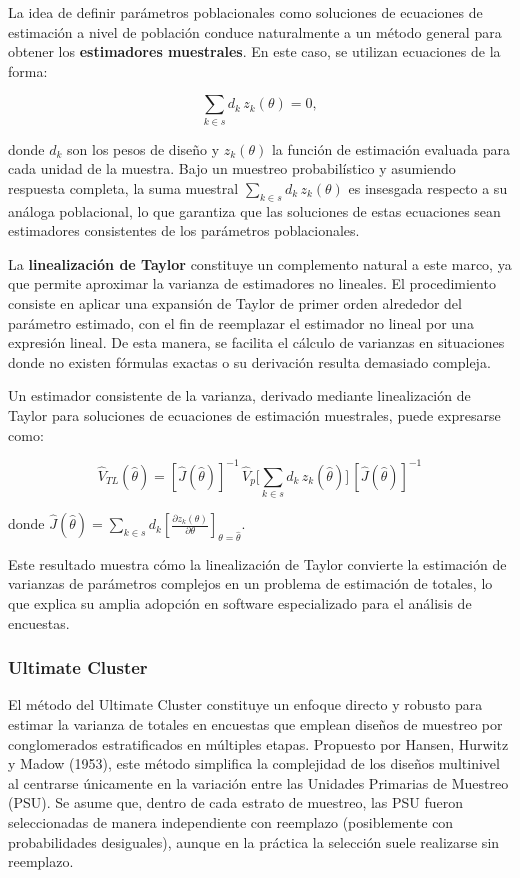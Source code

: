 \documentclass[
  12pt,
]{book}
\begin{document}
La idea de definir parámetros poblacionales como soluciones de ecuaciones de estimación a nivel de población conduce naturalmente a un método general para obtener los \textbf{estimadores muestrales}. En este caso, se utilizan ecuaciones de la forma:

\[
\sum_{k\in s} d_k\, z_k(\theta)=0,
\]

donde \(d_k\) son los pesos de diseño y \(z_k(\theta)\) la función de estimación evaluada para cada unidad de la muestra. Bajo un muestreo probabilístico y asumiendo respuesta completa, la suma muestral \(\sum_{k\in s} d_k\, z_k(\theta)\) es insesgada respecto a su análoga poblacional, lo que garantiza que las soluciones de estas ecuaciones sean estimadores consistentes de los parámetros poblacionales.

La \textbf{linealización de Taylor} constituye un complemento natural a este marco, ya que permite aproximar la varianza de estimadores no lineales. El procedimiento consiste en aplicar una expansión de Taylor de primer orden alrededor del parámetro estimado, con el fin de reemplazar el estimador no lineal por una expresión lineal. De esta manera, se facilita el cálculo de varianzas en situaciones donde no existen fórmulas exactas o su derivación resulta demasiado compleja.

Un estimador consistente de la varianza, derivado mediante linealización de Taylor para soluciones de ecuaciones de estimación muestrales, puede expresarse como:

\[
\hat{V}_{TL}(\hat{\theta}) = [\hat{J}(\hat{\theta})]^{-1} \, \hat{V}_p \Bigg[\sum_{k\in s} d_k\, z_k(\hat{\theta})\Bigg] \, [\hat{J}(\hat{\theta})]^{-1}
\]

donde \(\hat{J}(\hat{\theta}) = \sum_{k\in s} d_k \left[ \frac{\partial z_k(\theta)}{\partial \theta} \right]_{\theta=\hat{\theta}}\).

Este resultado muestra cómo la linealización de Taylor convierte la estimación de varianzas de parámetros complejos en un problema de estimación de totales, lo que explica su amplia adopción en software especializado para el análisis de encuestas.

\subsubsection*{Ultimate Cluster}\label{ultimate-cluster}

El método del Ultimate Cluster constituye un enfoque directo y robusto para estimar la varianza de totales en encuestas que emplean diseños de muestreo por conglomerados estratificados en múltiples etapas. Propuesto por Hansen, Hurwitz y Madow (1953), este método simplifica la complejidad de los diseños multinivel al centrarse únicamente en la variación entre las Unidades Primarias de Muestreo (PSU). Se asume que, dentro de cada estrato de muestreo, las PSU fueron seleccionadas de manera independiente con reemplazo (posiblemente con probabilidades desiguales), aunque en la práctica la selección suele realizarse sin reemplazo.
\end{document}
